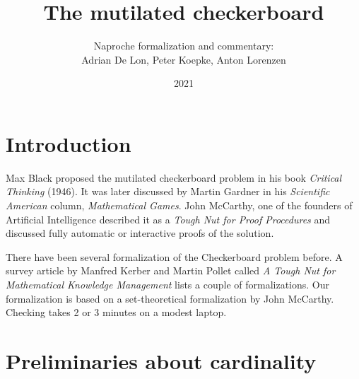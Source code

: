 \documentclass{article}
\title{The mutilated checkerboard}
\author{Naproche formalization and commentary:\\ Adrian De Lon, Peter Koepke, Anton Lorenzen}
\date{2021}
\begin{document}
\maketitle





\section{Introduction}

Max Black proposed the mutilated checkerboard problem in his book
\textit{Critical Thinking} (1946).
%
It was later discussed by Martin Gardner in his
\textit{Scientific American} column, \textit{Mathematical Games}.
%
John McCarthy, one of the
founders of Artificial Intelligence described it as a
\textit{Tough Nut for Proof Procedures}
and discussed fully automatic or interactive proofs of the solution.

There have been several formalization of the Checkerboard problem before. A
survey article by Manfred Kerber and Martin Pollet called \emph{A Tough Nut
for Mathematical Knowledge Management} lists a couple of formalizations.
Our formalization is based on a set-theoretical formalization by John McCarthy.
Checking takes 2 or 3 minutes on a modest laptop.

\begin{comment}
    \begin{forthel}
        [readtex preliminaries.ftl.tex]
        [synonym coordinate/-s]
        [synonym square/-s]
        [synonym subset/-s]
        
        Let $f : X\to Y$ stand for $f : X\rightarrow Y$.
    \end{forthel}
\end{comment}


\section{Preliminaries about cardinality}
\end{document}
